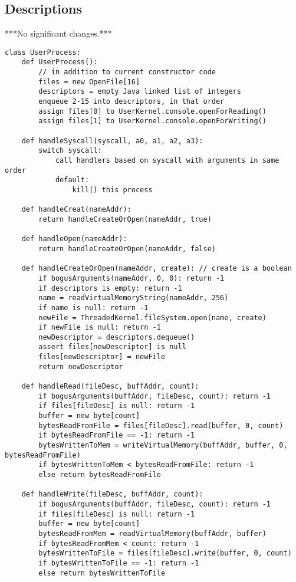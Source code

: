 \documentclass{article}
\begin{document}
\subsection{Descriptions}
\large
***No significant changes.***
\normalsize
\begin{verbatim}
class UserProcess:
    def UserProcess():
        // in addition to current constructor code
        files = new OpenFile[16]
        descriptors = empty Java linked list of integers
        enqueue 2-15 into descriptors, in that order
        assign files[0] to UserKernel.console.openForReading()
        assign files[1] to UserKernel.console.openForWriting()

    def handleSyscall(syscall, a0, a1, a2, a3):
        switch syscall:
            call handlers based on syscall with arguments in same order
            default:
                kill() this process

    def handleCreat(nameAddr):
        return handleCreateOrOpen(nameAddr, true)

    def handleOpen(nameAddr):
        return handleCreateOrOpen(nameAddr, false)

    def handleCreateOrOpen(nameAddr, create): // create is a boolean
        if bogusArguments(nameAddr, 0, 0): return -1
        if descriptors is empty: return -1
        name = readVirtualMemoryString(nameAddr, 256)
        if name is null: return -1
        newFile = ThreadedKernel.fileSystem.open(name, create)
        if newFile is null: return -1
        newDescriptor = descriptors.dequeue()
        assert files[newDescriptor] is null
        files[newDescriptor] = newFile
        return newDescriptor

    def handleRead(fileDesc, buffAddr, count):
        if bogusArguments(buffAddr, fileDesc, count): return -1
        if files[fileDesc] is null: return -1
        buffer = new byte[count]
        bytesReadFromFile = files[fileDesc].read(buffer, 0, count)
        if bytesReadFromFile == -1: return -1
        bytesWrittenToMem = writeVirtualMemory(buffAddr, buffer, 0, bytesReadFromFile)
        if bytesWrittenToMem < bytesReadFromFile: return -1
        else return bytesReadFromFile
    
    def handleWrite(fileDesc, buffAddr, count):
        if bogusArguments(buffAddr, fileDesc, count): return -1
        if files[fileDesc] is null: return -1
        buffer = new byte[count]
        bytesReadFromMem = readVirtualMemory(buffAddr, buffer)
        if bytesReadFromMem < count: return -1
        bytesWrittenToFile = files[fileDesc].write(buffer, 0, count)
        if bytesWrittenToFile == -1: return -1
        else return bytesWrittenToFile


\end{verbatim}
\end{document}
